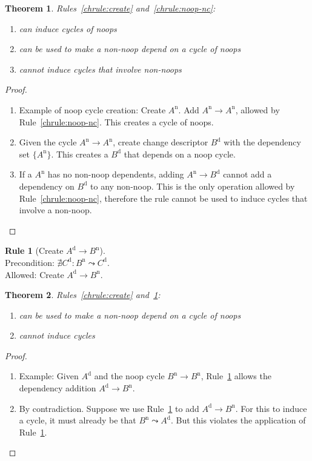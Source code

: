 \documentclass{article}
\newtheorem{thm}{Theorem}[section]
\theoremstyle{definition}
\newtheorem{chrule}{Rule}[section]
\newcommand{\cd}[1]{\ensuremath{#1}}
\newcommand{\dcd}[1]{\ensuremath{\cd{#1}^\mathrm{d}}}
\newcommand{\ncd}[1]{\ensuremath{\cd{#1}^\mathrm{n}}}
\newcommand{\depends}[2]{\ensuremath{#1\! \rightarrow\! #2}}
\newcommand{\indirdepends}[2]{\ensuremath{#1\! \leadsto\! #2}}
\begin{document}
\begin{thm}\label{thm:noop-nc-unsafe}
  Rules~\ref{chrule:create} and~\ref{chrule:noop-nc}:
  \begin{enumerate}
  \item can induce cycles of noops
  \item can be used to make a non-noop depend on a cycle of noops
  \item cannot induce cycles that involve non-noops
  \end{enumerate}
\end{thm}
\begin{proof}
  \mbox{}
  \begin{enumerate}
  \item Example of noop cycle creation: Create \ncd{A}. Add
    \depends{\ncd{A}}{\ncd{A}}, allowed by Rule~\ref{chrule:noop-nc}.
    This creates a cycle of noops.
  \item Given the cycle \depends{\ncd{A}}{\ncd{A}}, create change
    descriptor \dcd{B} with the dependency set \(\{\ncd{A}\}\). This creates
    a \dcd{B} that depends on a noop cycle.
  \item If a \ncd{A} has no non-noop dependents, adding
    \depends{\ncd{A}}{\dcd{B}} cannot add a dependency on \cd{\dcd{B}}
    to any non-noop. This is the only operation allowed by
    Rule~\ref{chrule:noop-nc}, therefore the rule cannot be used to
    induce cycles that involve a non-noop.
  \end{enumerate}
\end{proof}

\begin{chrule}[Create \depends{\dcd{A}}{\ncd{B}}]\label{chrule:noop-cn}
  \mbox{}\\
  Precondition: \(\nexists \dcd{C}\!: \indirdepends{\ncd{B}}{\dcd{C}}\).\\
  Allowed: Create \depends{\dcd{A}}{\ncd{B}}.
\end{chrule}

\begin{thm}\label{thm:noop-cn-unsafe}
  Rules~\ref{chrule:create} and~\ref{chrule:noop-cn}:
  \begin{enumerate}
  \item can be used to make a non-noop depend on a cycle of noops
  \item cannot induce cycles
  \end{enumerate}
\end{thm}
\begin{proof}
  \mbox{}
  \begin{enumerate}
  \item Example: Given \dcd{A} and the noop cycle \depends{\ncd{B}}{\ncd{B}},
    Rule~\ref{chrule:noop-cn} allows the dependency addition
    \depends{\dcd{A}}{\ncd{B}}.
  \item By contradiction.
    Suppose we use Rule~\ref{chrule:noop-cn} to add
    \depends{\dcd{A}}{\ncd{B}}. For this to induce a cycle, it must
    already be that \indirdepends{\ncd{B}}{\dcd{A}}. But this violates
    the application of Rule~\ref{chrule:noop-cn}.
  \end{enumerate}
\end{proof}
\end{document}
